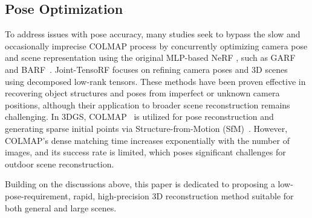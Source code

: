 \subsection{Pose Optimization}
To address issues with pose accuracy, many studies seek to bypass the slow and occasionally imprecise COLMAP process by concurrently optimizing camera pose and scene representation using the original MLP-based NeRF \citep{wang2021nerfmm}, such as GARF~\citep{chng2022gaussian} and BARF~\citep{lin2021barf}. Joint-TensoRF\citep{Joint-TensoRF} focuses on refining camera poses and 3D scenes using decomposed low-rank tensors. These methods have been proven effective in recovering object structures and poses from imperfect or unknown camera positions, although their application to broader scene reconstruction remains challenging. In 3DGS, COLMAP~\citep{schoenberger2016sfm,schoenberger2016mvs} is utilized for pose reconstruction and generating sparse initial points via Structure-from-Motion (SfM)~\citep{schoenberger2016sfm}. However, COLMAP's dense matching time increases exponentially with the number of images, and its success rate is limited, which poses significant challenges for outdoor scene reconstruction.

Building on the discussions above, this paper is dedicated to proposing a low-pose-requirement, rapid, high-precision 3D reconstruction method suitable for both general and large scenes.